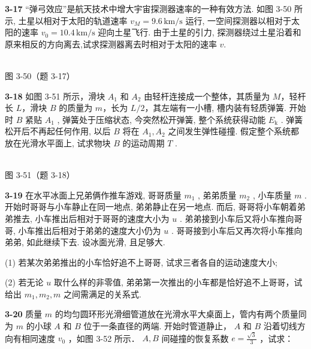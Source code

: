 \newpage

\textbf{3-17} “弹弓效应”是航天技术中增大宇宙探测器速率的一种有效方法. 如图 3-50 所示, 土星以相对于太阳的轨道速率 $v_{M}=9.6\,\mathrm{km/s}$ 运行, 一空间探测器以相对于太阳的速率 $v_{0}=10.4\,\mathrm{km/s}$ 迎向土星飞行. 由于土星的引力, 探测器绕过土星沿着和原来相反的方向离去,试求探测器离去时相对于太阳的速率 $v$.

\begin{center}
\resizebox{0.50\textwidth}{!}{}\\[4pt]
{\small 图 3-50（题 3-17）}
\end{center}

\newpage

\textbf{3-18} 如图 3-51 所示，滑块 $A_{1}$ 和 $A_{2}$ 由轻杆连接成一个整体，其质量为 $M$，轻杆长 $L$，滑块 $B$ 的质量为 $m$，长为 $L/2$，其左端有一小槽, 槽内装有轻质弹簧. 开始时 $B$ 紧贴 $A_{1}$ , 弹簧处于压缩状态, 今突然松开弹簧, 整个系统获得动能 $E_{\mathrm{k}}$ . 弹簧松开后不再起任何作用, 以后 $B$ 将在 $A_{1}, A_{2}$ 之间发生弹性碰撞. 假定整个系统都放在光滑水平面上, 试求物块 $B$ 的运动周期 $T$ .

\begin{center}
\resizebox{0.50\textwidth}{!}{}\\[4pt]
{\small 图 3-51（题 3-18）}
\end{center}

\newpage

\textbf{3-19} 在水平冰面上兄弟俩作推车游戏, 哥哥质量 $m_{1}$ , 弟弟质量 $m_{2}$ , 小车质量 $m$ . 开始时哥哥与小车静止在同一地点, 弟弟静止在另一地点. 而后, 哥哥将小车朝着弟弟推去, 小车推出后相对于哥哥的速度大小为 $u$ . 弟弟接到小车后又将小车推向哥哥, 小车推出后相对于弟弟的速度大小仍为 $u$ . 哥哥接到小车后又再次将小车推向弟弟, 如此继续下去. 设冰面光滑, 且足够大.

(1) 若某次弟弟推出的小车恰好追不上哥哥, 试求三者各自的运动速度大小;

(2) 若无论 $u$ 取什么样的非零值, 弟弟第一次推出的小车都是恰好追不上哥哥，试给出 $m_{1}, m_{2}, m$ 之间需满足的关系式.

\newpage

\textbf{3-20} 质量 $m$ 的均匀圆环形光滑细管道放在光滑水平大桌面上，管内有两个质量同为 $m$ 的小球 $A$ 和 $B$ 位于一条直径的两端. 开始时管道静止， $A$ 和 $B$ 沿着切线方向有相同速度 $v_0$ ，如图 3-52 所示． $A, B$ 间碰撞的恢复系数 $e = \frac{\sqrt{3}}{3}$ ，试求：

